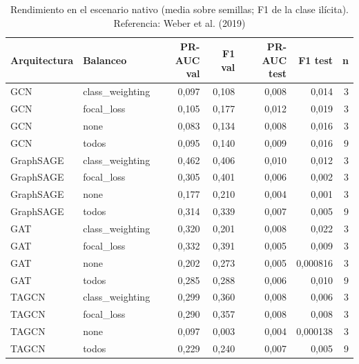 \begin{table}[htbp]
\centering\small
\caption{Rendimiento en el escenario nativo (media sobre semillas; F1 de la clase ilícita). Referencia: Weber et al. (2019)}
\label{tab:v4-rendimiento}
\begin{tabular}{llrrrrr}
\toprule
Arquitectura & Balanceo & PR-AUC val & F1 val & PR-AUC test & F1 test & n \\
\midrule
GCN & class\_weighting & 0,097 & 0,108 & 0,008 & 0,014 & 3 \\
GCN & focal\_loss & 0,105 & 0,177 & 0,012 & 0,019 & 3 \\
GCN & none & 0,083 & 0,134 & 0,008 & 0,016 & 3 \\
GCN & todos & 0,095 & 0,140 & 0,009 & 0,016 & 9 \\
GraphSAGE & class\_weighting & 0,462 & 0,406 & 0,010 & 0,012 & 3 \\
GraphSAGE & focal\_loss & 0,305 & 0,401 & 0,006 & 0,002 & 3 \\
GraphSAGE & none & 0,177 & 0,210 & 0,004 & 0,001 & 3 \\
GraphSAGE & todos & 0,314 & 0,339 & 0,007 & 0,005 & 9 \\
GAT & class\_weighting & 0,320 & 0,201 & 0,008 & 0,022 & 3 \\
GAT & focal\_loss & 0,332 & 0,391 & 0,005 & 0,009 & 3 \\
GAT & none & 0,202 & 0,273 & 0,005 & 0,000816 & 3 \\
GAT & todos & 0,285 & 0,288 & 0,006 & 0,010 & 9 \\
TAGCN & class\_weighting & 0,299 & 0,360 & 0,008 & 0,006 & 3 \\
TAGCN & focal\_loss & 0,290 & 0,357 & 0,008 & 0,008 & 3 \\
TAGCN & none & 0,097 & 0,003 & 0,004 & 0,000138 & 3 \\
TAGCN & todos & 0,229 & 0,240 & 0,007 & 0,005 & 9 \\
\bottomrule
\end{tabular}
\end{table}
